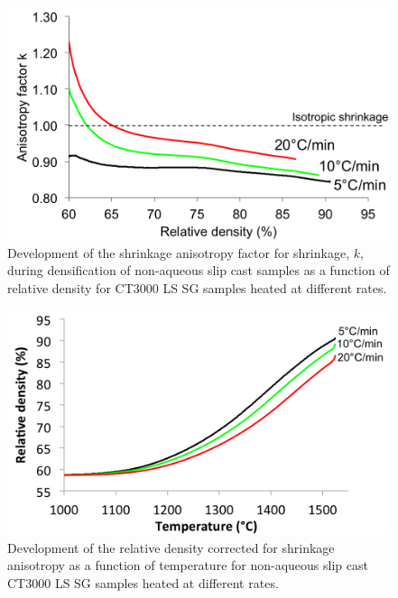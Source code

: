 \newpage
\begin{figure}[H]
	\centering
	\includegraphics[width=\textwidth]{Chapter-6/Figures/Figure2.png}
	\caption{Development of the shrinkage anisotropy factor for shrinkage, $k$, during densification of non-aqueous slip cast samples as a function of relative density for CT3000 LS SG samples heated at different rates.}
	\label{Ch6-figure:Figure2}
\end{figure}

\newpage
\begin{figure}[H]
	\centering
	\includegraphics[width=\textwidth]{Chapter-6/Figures/Figure3.png}
	\caption{Development of the relative density corrected for shrinkage anisotropy as a function of temperature for non-aqueous slip cast CT3000 LS SG samples heated at different rates.}
	\label{Ch6-figure:Figure3}
\end{figure}

